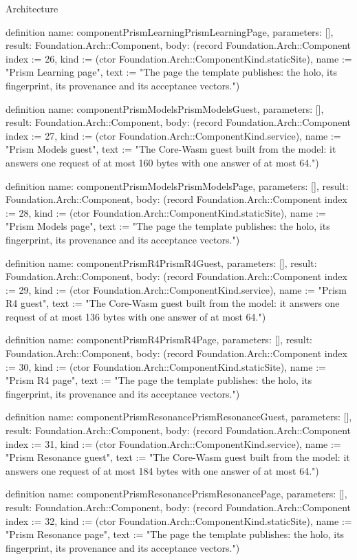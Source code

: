 \begin{lexlean}{Architecture}
\begin{semanticmodule}
definition{
  name: componentPrismLearningPrismLearningPage,
  parameters: [],
  result: Foundation.Arch::Component,
  body: (record Foundation.Arch::Component {index := 26, kind := (ctor Foundation.Arch::ComponentKind.staticSite), name := "Prism Learning page", text := "The page the template publishes: the holo, its fingerprint, its provenance and its acceptance vectors."})
}

definition{
  name: componentPrismModelsPrismModelsGuest,
  parameters: [],
  result: Foundation.Arch::Component,
  body: (record Foundation.Arch::Component {index := 27, kind := (ctor Foundation.Arch::ComponentKind.service), name := "Prism Models guest", text := "The Core-Wasm guest built from the model: it answers one request of at most 160 bytes with one answer of at most 64."})
}

definition{
  name: componentPrismModelsPrismModelsPage,
  parameters: [],
  result: Foundation.Arch::Component,
  body: (record Foundation.Arch::Component {index := 28, kind := (ctor Foundation.Arch::ComponentKind.staticSite), name := "Prism Models page", text := "The page the template publishes: the holo, its fingerprint, its provenance and its acceptance vectors."})
}

definition{
  name: componentPrismR4PrismR4Guest,
  parameters: [],
  result: Foundation.Arch::Component,
  body: (record Foundation.Arch::Component {index := 29, kind := (ctor Foundation.Arch::ComponentKind.service), name := "Prism R4 guest", text := "The Core-Wasm guest built from the model: it answers one request of at most 136 bytes with one answer of at most 64."})
}

definition{
  name: componentPrismR4PrismR4Page,
  parameters: [],
  result: Foundation.Arch::Component,
  body: (record Foundation.Arch::Component {index := 30, kind := (ctor Foundation.Arch::ComponentKind.staticSite), name := "Prism R4 page", text := "The page the template publishes: the holo, its fingerprint, its provenance and its acceptance vectors."})
}

definition{
  name: componentPrismResonancePrismResonanceGuest,
  parameters: [],
  result: Foundation.Arch::Component,
  body: (record Foundation.Arch::Component {index := 31, kind := (ctor Foundation.Arch::ComponentKind.service), name := "Prism Resonance guest", text := "The Core-Wasm guest built from the model: it answers one request of at most 184 bytes with one answer of at most 64."})
}

definition{
  name: componentPrismResonancePrismResonancePage,
  parameters: [],
  result: Foundation.Arch::Component,
  body: (record Foundation.Arch::Component {index := 32, kind := (ctor Foundation.Arch::ComponentKind.staticSite), name := "Prism Resonance page", text := "The page the template publishes: the holo, its fingerprint, its provenance and its acceptance vectors."})
}


\end{semanticmodule}
\end{lexlean}
